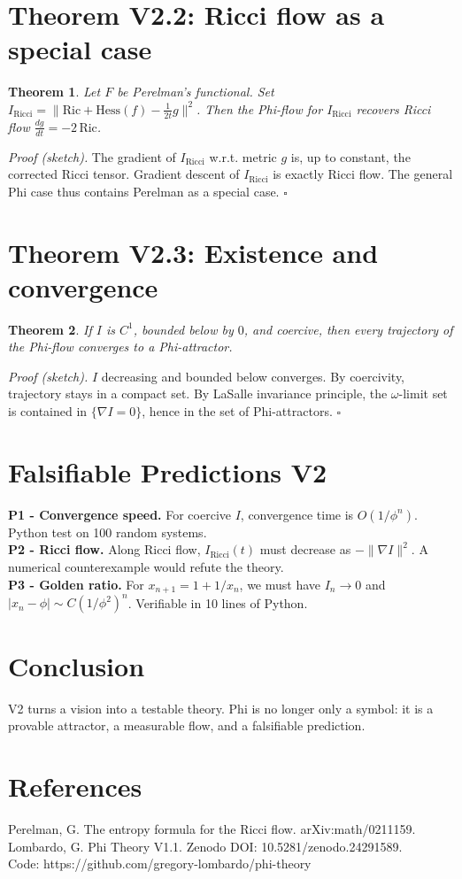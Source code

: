 \documentclass[11pt,a4paper]{article}
\newtheorem{theorem}{Theorem}[section]
\begin{document}
\section{Theorem V2.2: Ricci flow as a special case}
\begin{theorem}
Let $F$ be Perelman's functional. Set $I_{\text{Ricci}} = \| \text{Ric} + \text{Hess}(f) - \frac{1}{2t}g\|^2$. Then the Phi-flow for $I_{\text{Ricci}}$ recovers Ricci flow $\frac{dg}{dt} = -2\,\text{Ric}$.
\end{theorem}
\textit{Proof (sketch).} The gradient of $I_{\text{Ricci}}$ w.r.t. metric $g$ is, up to constant, the corrected Ricci tensor. Gradient descent of $I_{\text{Ricci}}$ is exactly Ricci flow. The general Phi case thus contains Perelman as a special case. $\square$

\section{Theorem V2.3: Existence and convergence}
\begin{theorem}
If $I$ is $C^1$, bounded below by $0$, and coercive, then every trajectory of the Phi-flow converges to a Phi-attractor.
\end{theorem}
\textit{Proof (sketch).} $I$ decreasing and bounded below converges. By coercivity, trajectory stays in a compact set. By LaSalle invariance principle, the $\omega$-limit set is contained in $\{ \nabla I = 0\}$, hence in the set of Phi-attractors. $\square$

\section{Falsifiable Predictions V2}
\textbf{P1 - Convergence speed.} For coercive $I$, convergence time is $O(1/\phi^n)$. Python test on 100 random systems.\\
\textbf{P2 - Ricci flow.} Along Ricci flow, $I_{\text{Ricci}}(t)$ must decrease as $-\|\nabla I\|^2$. A numerical counterexample would refute the theory.\\
\textbf{P3 - Golden ratio.} For $x_{n+1}=1+1/x_n$, we must have $I_n\to 0$ and $|x_n-\phi|\sim C(1/\phi^2)^n$. Verifiable in 10 lines of Python.

\section{Conclusion}
V2 turns a vision into a testable theory. Phi is no longer only a symbol: it is a provable attractor, a measurable flow, and a falsifiable prediction.

\section*{References}
Perelman, G. The entropy formula for the Ricci flow. arXiv:math/0211159.\\
Lombardo, G. Phi Theory V1.1. Zenodo DOI: 10.5281/zenodo.24291589.\\
Code: https://github.com/gregory-lombardo/phi-theory
\end{document}
